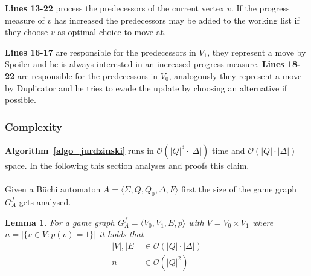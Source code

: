 \documentclass[12pt,oneside,bibliography=totoc,abstracton]{scrartcl}
\newcommand{\algoref}[1]{\textbf{Algorithm~\ref{#1}}}
\newtheorem{mylemma}{Lemma}
\begin{document}
\textbf{Lines 13-22} process the predecessors of the current vertex $v$.
If the progress measure of $v$ has increased the predecessors may be added to the working list if
they choose $v$ as optimal choice to move at.

\textbf{Lines 16-17} are responsible for the predecessors in $V_1$, they represent a move
by Spoiler and he is always interested in an increased progress measure.
\textbf{Lines 18-22} are responsible for the predecessors in $V_0$, analogously they represent a move
by Duplicator and he tries to evade the update by choosing an alternative if possible.

\subsubsection{Complexity}
\algoref{algo_jurdzinski} runs in $\mathcal{O}(|Q|^3 \cdot |\Delta|)$ time and
$\mathcal{O}(|Q| \cdot |\Delta|)$ space. In the following this section analyses and proofs this claim.\\\\
Given a Büchi automaton $A = \langle \Sigma, Q, Q_0, \Delta, F\rangle$ first the
size of the game graph $G^f_A$ gets analysed.\\
\begin{mylemma}\label{lemma_gamegraphcomplexity}
	For a game graph $G^f_A = \langle V_0, V_1, E, p\rangle$ with $V = V_0 \times V_1$ where
	$n = |\{v \in V : p(v) = 1\}|$ it holds that
	\begin{align*}
		|V|, |E|			&\in \mathcal{O}(|Q| \cdot |\Delta|)\\
		n	&\in \mathcal{O}(|Q|^2)
	\end{align*}
\end{mylemma}
\end{document}
